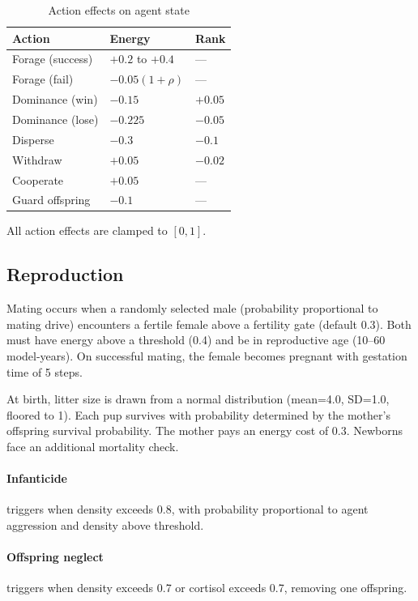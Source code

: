\begin{table}[h]
\centering
\caption{Action effects on agent state}
\label{tab:actions}
\begin{tabular}{lll}
\toprule
Action & Energy & Rank \\
\midrule
Forage (success) & $+0.2$ to $+0.4$ & --- \\
Forage (fail) & $-0.05(1+\rho)$ & --- \\
Dominance (win) & $-0.15$ & $+0.05$ \\
Dominance (lose) & $-0.225$ & $-0.05$ \\
Disperse & $-0.3$ & $-0.1$ \\
Withdraw & $+0.05$ & $-0.02$ \\
Cooperate & $+0.05$ & --- \\
Guard offspring & $-0.1$ & --- \\
\bottomrule
\end{tabular}
\end{table}

All action effects are clamped to $[0, 1]$.

\subsection{Reproduction}
\label{sec:reproduction}

Mating occurs when a randomly selected male (probability proportional to mating drive) encounters a fertile female above a fertility gate (default 0.3). Both must have energy above a threshold (0.4) and be in reproductive age (10--60 model-years). On successful mating, the female becomes pregnant with gestation time of 5 steps.

At birth, litter size is drawn from a normal distribution (mean=4.0, SD=1.0, floored to 1). Each pup survives with probability determined by the mother's offspring survival probability. The mother pays an energy cost of 0.3. Newborns face an additional mortality check.

\paragraph{Infanticide} triggers when density exceeds 0.8, with probability proportional to agent aggression and density above threshold. \paragraph{Offspring neglect} triggers when density exceeds 0.7 or cortisol exceeds 0.7, removing one offspring.

